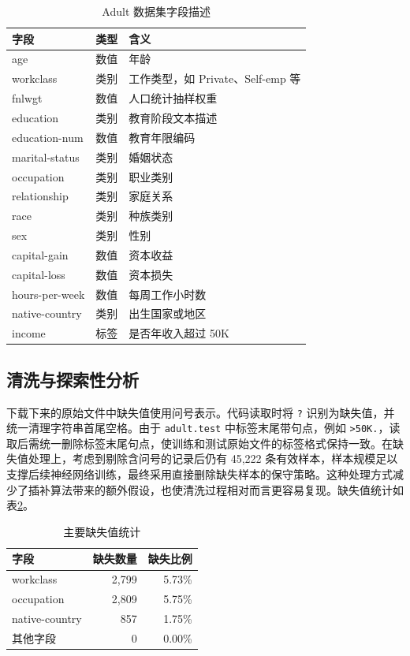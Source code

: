 \documentclass[UTF8,a4paper,12pt]{ctexart}
\begin{document}
\begin{table}[H]
\centering
\caption{Adult 数据集字段描述}
\label{tab:fields}
\begin{tabular}{p{3.2cm}p{2.2cm}p{7cm}}
\toprule
字段 & 类型 & 含义 \\
\midrule
age & 数值 & 年龄 \\
workclass & 类别 & 工作类型，如 Private、Self-emp 等 \\
fnlwgt & 数值 & 人口统计抽样权重 \\
education & 类别 & 教育阶段文本描述 \\
education-num & 数值 & 教育年限编码 \\
marital-status & 类别 & 婚姻状态 \\
occupation & 类别 & 职业类别 \\
relationship & 类别 & 家庭关系 \\
race & 类别 & 种族类别 \\
sex & 类别 & 性别 \\
capital-gain & 数值 & 资本收益 \\
capital-loss & 数值 & 资本损失 \\
hours-per-week & 数值 & 每周工作小时数 \\
native-country & 类别 & 出生国家或地区 \\
income & 标签 & 是否年收入超过 50K \\
\bottomrule
\end{tabular}
\end{table}

\subsection{清洗与探索性分析}
下载下来的原始文件中缺失值使用问号表示。代码读取时将 \texttt{?} 识别为缺失值，并统一清理字符串首尾空格。由于 \texttt{adult.test} 中标签末尾带句点，例如 \texttt{>50K.}，读取后需统一删除标签末尾句点，使训练和测试原始文件的标签格式保持一致。在缺失值处理上，考虑到剔除含问号的记录后仍有 45,222 条有效样本，样本规模足以支撑后续神经网络训练，最终采用直接删除缺失样本的保守策略。这种处理方式减少了插补算法带来的额外假设，也使清洗过程相对而言更容易复现。缺失值统计如表\ref{tab:missing}。

\begin{table}[H]
\centering
\caption{主要缺失值统计}
\label{tab:missing}
\begin{tabular}{lrr}
\toprule
字段 & 缺失数量 & 缺失比例 \\
\midrule
workclass & 2,799 & 5.73\% \\
occupation & 2,809 & 5.75\% \\
native-country & 857 & 1.75\% \\
其他字段 & 0 & 0.00\% \\
\bottomrule
\end{tabular}
\end{table}
\end{document}
